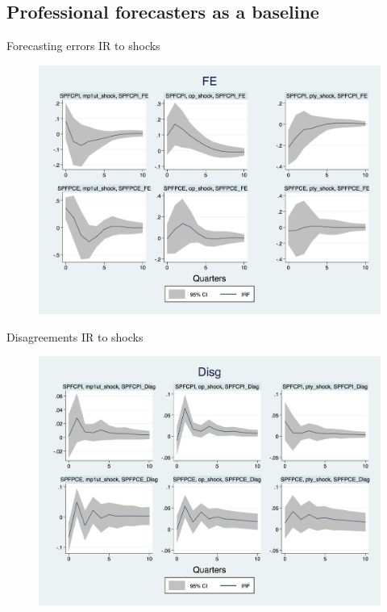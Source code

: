 \documentclass{beamer}
\begin{document}
\subsection{Professional forecasters as a baseline }

\begin{frame}{Forecasting errors IR to  shocks}

\begin{figure}
	\includegraphics[scale=0.3]{figures/SPFFE_ashocks.png} 
\end{figure}

\end{frame}


\begin{frame}{Disagreements IR to  shocks}

\begin{figure}
	\includegraphics[scale=0.3]{figures/SPFDisg_ashocks.png} 
\end{figure}

\end{frame}
\end{document}
